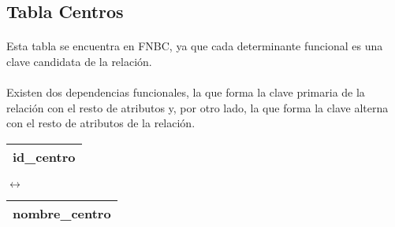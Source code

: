 \subsection{Tabla Centros}

  \paragraph{}Esta tabla se encuentra en FNBC, ya que cada determinante
  funcional es una clave candidata de la relación.

  \paragraph{}Existen dos dependencias funcionales, la que forma la clave
  primaria de la relación con el resto de atributos y, por otro lado, la que
  forma la clave alterna con el resto de atributos de la relación.

  \begin{center}
    \begin{minipage}{3.7cm}{\begin{flushright}\begin{tabular}{ | c | }
                  \hline
                  id\_centro \\
                  \hline
                 \end{tabular}\end{flushright} }
    \end{minipage}
    \begin{minipage}{0.8cm}{$\longleftrightarrow$}
    \end{minipage}
    \begin{minipage}{5.9cm}{\begin{tabular}{ | c | }
                  \hline
                  nombre\_centro \\
                  \hline
                 \end{tabular} }
    \end{minipage}
  \end{center}
